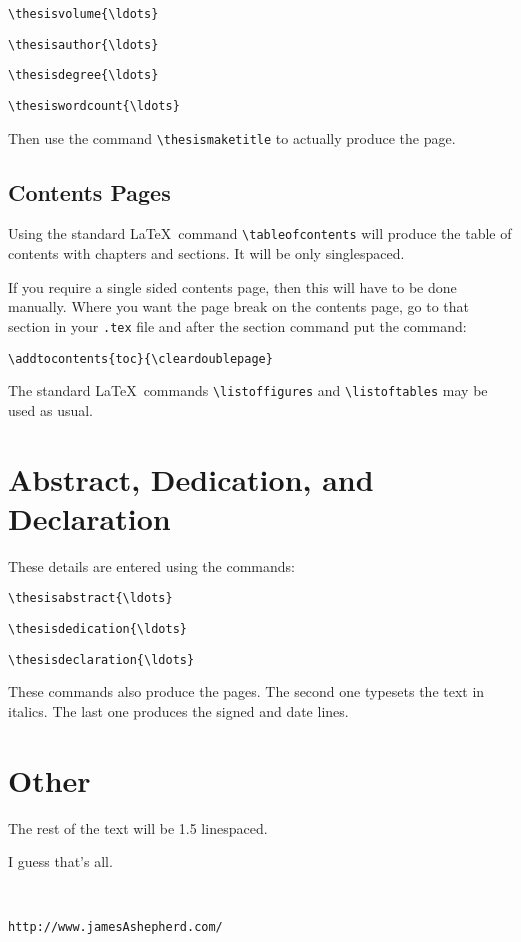 \documentclass[jasheads]{jasthesis}
\begin{document}
{\ttfamily\verb=\thesisvolume{\ldots}=}

{\ttfamily\verb=\thesisauthor{\ldots}=}

{\ttfamily\verb=\thesisdegree{\ldots}=}

{\ttfamily\verb=\thesiswordcount{\ldots}=}

Then use the command {\ttfamily\verb=\thesismaketitle=} to actually produce the page.

\section{Contents Pages}

Using the standard \LaTeX\ command {\ttfamily\verb=\tableofcontents=}
will produce the table of contents with chapters and sections. It will
be only singlespaced.

If you require a single sided contents page, then this will have to be done manually.
Where you want the page break on the contents page, go to that section in your
\texttt{.tex} file and after the section command put the command:

{\ttfamily\verb=\addtocontents{toc}{\cleardoublepage}=}

The standard \LaTeX\ commands {\ttfamily\verb=\listoffigures=} and
{\ttfamily\verb=\listoftables=} may be used as usual.


\chapter{Abstract, Dedication, and Declaration}

These details are entered using the commands:

{\ttfamily\verb=\thesisabstract{\ldots}=}

{\ttfamily\verb=\thesisdedication{\ldots}=}

{\ttfamily\verb=\thesisdeclaration{\ldots}=}

These commands also produce the pages. The second one typesets the text in italics.
The last one produces the signed and date lines.

\chapter{Other}

The rest of the text will be 1.5 linespaced.

I guess that's all.

~

{\ttfamily\verb=http://www.jamesAshepherd.com/=}
\end{document}
